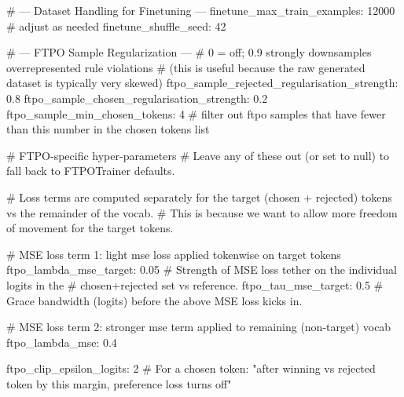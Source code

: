 \documentclass[11pt]{article}
\begin{document}
\begin{cfgblock}
# --- Dataset Handling for Finetuning ---
finetune_max_train_examples: 12000 # adjust as needed
finetune_shuffle_seed: 42

# --- FTPO Sample Regularization ---
# 0 = off; 0.9 strongly downsamples overrepresented rule violations
# (this is useful because the raw generated dataset is typically very skewed)
ftpo_sample_rejected_regularisation_strength: 0.8
ftpo_sample_chosen_regularisation_strength: 0.2
ftpo_sample_min_chosen_tokens: 4 # filter out ftpo samples that have fewer than this number in the chosen tokens list


# FTPO-specific hyper-parameters
# Leave any of these out (or set to null) to fall back to FTPOTrainer defaults.

# Loss terms are computed separately for the target (chosen + rejected) tokens vs the remainder of the vocab.
# This is because we want to allow more freedom of movement for the target tokens.

# MSE loss term 1: light mse loss applied tokenwise on target tokens
ftpo_lambda_mse_target: 0.05   # Strength of MSE loss tether on the individual logits in the
                                        #   chosen+rejected set vs reference.
ftpo_tau_mse_target: 0.5       # Grace bandwidth (logits) before the above MSE loss kicks in.

# MSE loss term 2: stronger mse term applied to remaining (non-target) vocab
ftpo_lambda_mse: 0.4

ftpo_clip_epsilon_logits: 2     # For a chosen token: "after winning vs rejected token by this margin, preference loss turns off"

\end{cfgblock}
\end{document}
